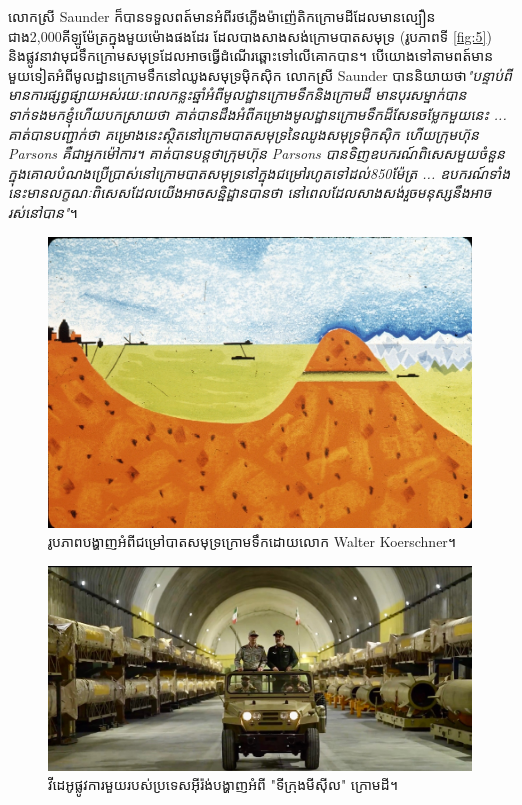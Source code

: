 \documentclass[10pt,twocolumn,letterpaper]{article}
\begin{document}
	លោកស្រី​ Saunder ក៏បានទទួលពត៍មានអំពីរថភ្លើងម៉ាញ៉េតិកក្រោមដីដែលមានល្បឿនជាង2,000គីឡូម៉ែត្រក្នុងមួយម៉ោងផងដែរ ដែលបាងសាងសង់ក្រោមបាតសមុទ្រ (រូបភាពទី \ref{fig:5}) និងផ្លូវនាវាមុជទឹកក្រោមសមុទ្រដែលអាចធ្វើដំណើរឆ្ពោះទៅលើគោកបាន។ បើយោងទៅតាមពត៍មានមួយទៀតអំពីមូលដ្ឋានក្រោមទឹកនៅឈូងសមុទ្រម៉ិកស៊ិក លោកស្រី Saunder បាននិយាយថា\textit{"បន្ទាប់ពីមានការផ្សព្វផ្សាយអស់រយ:ពេលកន្លះឆ្នាំអំពីមូលដ្ឋានក្រោមទឹកនិងក្រោមដី មានបុរសម្នាក់បានទាក់ទងមកខ្ញុំហើយបកស្រាយថា គាត់បានដឹងអំពីគម្រោងមូលដ្ឋានក្រោមទឹកដ៏សែនចម្លែកមួយនេះ ... គាត់បានបញ្ជាក់ថា គម្រោងនេះស្ថិតនៅក្រោមបាតសមុទ្រនៃឈូងសមុទ្រម៉ិកស៊ិក ហើយក្រុមហ៊ុន Parsons គឺជាអ្នកម៉ៅការ។ គាត់បានបន្តថាក្រុមហ៊ុន Parsons បានទិញឧបករណ៍ពិសេសមួយចំនួន ក្នុងគោលបំណងប្រើប្រាស់នៅក្រោមបាតសមុទ្រនៅក្នុងជម្រៅរហូតទៅដល់850ម៉ែត្រ ... ឧបករណ៍ទាំងនេះមានលក្ខណៈពិសេសដែលយើងអាចសន្និដ្ឋានបានថា នៅពេលដែលសាងសង់រួចមនុស្សនឹងអាចរស់នៅបាន"}\cite{22}។
\begin{figure}[t]
\begin{center}
   \includegraphics[width=1\linewidth]{sub.jpg}
\end{center}
   \caption{រូបភាពបង្ហាញអំពីជម្រៅបាតសមុទ្រក្រោមទឹកដោយលោក Walter Koerschner\cite{22,23}។}
\label{fig:6}
\label{fig:onecol}
\end{figure}
\begin{figure}[t]
\begin{center}
   \includegraphics[width=1\linewidth]{iran.jpeg}
\end{center}
   \caption{វីដេអូផ្លូវការមួយរបស់ប្រទេសអុីរ៉ង់បង្ហាញអំពី "ទីក្រុងមីស៊ីល" ក្រោមដី\cite{39,40}។}
\label{fig:12}
\label{fig:onecol}
\end{figure}
\end{document}
